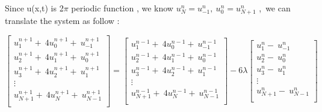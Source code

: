 \documentclass{report}
\begin{document}
Since u(x,t) is 2$\pi$ periodic function , we know 
$
u^{n}_{N} = u^{n}_{-1} , \ 
u^{n}_{0} =u^{n}_{N+1}
$ ,\ we can translate the system as follow :

\begin{displaymath}
\left[
\begin{matrix}
u^{n+1}_{1} + \ 4u^{n+1}_{0}+ \ u^{n+1}_{-1}\\
u^{n+1}_{2} + \ 4u^{n+1}_{1}+ \ u^{n+1}_{0}\\
u^{n+1}_{3} + \ 4u^{n+1}_{2}+ \ u^{n+1}_{1}\\
\vdots\\
u^{n+1}_{N+1}+ \ 4u^{n+1}_{N}+ \ u^{n+1}_{N-1}\\
\end{matrix}
\right]
=
\left[
\begin{matrix}
u^{n-1}_{1} + \ 4u^{n-1}_{0}+ \ u^{n-1}_{-1}\\
u^{n-1}_{2} + \ 4u^{n-1}_{1}+ \ u^{n-1}_{0}\\
u^{n-1}_{3} + \ 4u^{n-1}_{2}+ \ u^{n-1}_{1}\\
\vdots\\
u^{n-1}_{N+1}+ \ 4u^{n-1}_{N}+ \ u^{n-1}_{N-1}\\
\end{matrix}
\right]
-6\lambda
\left[
\begin{matrix}
u^{n}_{1} - \ u^{n}_{-1}\\
u^{n}_{2} - \ u^{n}_{0}\\
u^{n}_{3} - \ u^{n}_{1}\\
\vdots\\
u^{n}_{N+1} - \ u^{n}_{N-1}\\
\end{matrix}
\right]
\end{displaymath}
\end{document}
